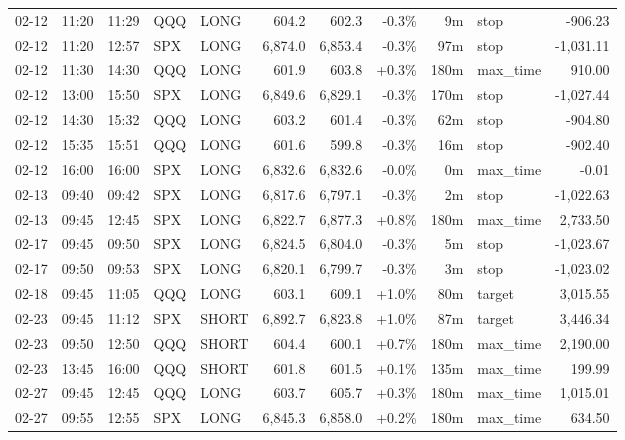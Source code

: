 \documentclass[11pt,a4paper,twoside]{article}
\begin{document}
\begin{center}
\begin{longtable}{>{\color{txtmain}}l l l l l r r r r >{\color{txtmain}}l r}
02-12 & 11:20 & 11:29 & QQQ & LONG & 604.2 & 602.3 & \textcolor{lossred}{-0.3\%} & 9m & stop & \textcolor{lossred}{-906.23} \\
02-12 & 11:20 & 12:57 & SPX & LONG & 6,874.0 & 6,853.4 & \textcolor{lossred}{-0.3\%} & 97m & stop & \textcolor{lossred}{-1,031.11} \\
02-12 & 11:30 & 14:30 & QQQ & LONG & 601.9 & 603.8 & \textcolor{wingreen}{+0.3\%} & 180m & max\_time & \textcolor{wingreen}{910.00} \\
02-12 & 13:00 & 15:50 & SPX & LONG & 6,849.6 & 6,829.1 & \textcolor{lossred}{-0.3\%} & 170m & stop & \textcolor{lossred}{-1,027.44} \\
02-12 & 14:30 & 15:32 & QQQ & LONG & 603.2 & 601.4 & \textcolor{lossred}{-0.3\%} & 62m & stop & \textcolor{lossred}{-904.80} \\
02-12 & 15:35 & 15:51 & QQQ & LONG & 601.6 & 599.8 & \textcolor{lossred}{-0.3\%} & 16m & stop & \textcolor{lossred}{-902.40} \\
02-12 & 16:00 & 16:00 & SPX & LONG & 6,832.6 & 6,832.6 & \textcolor{lossred}{-0.0\%} & 0m & max\_time & \textcolor{lossred}{-0.01} \\
02-13 & 09:40 & 09:42 & SPX & LONG & 6,817.6 & 6,797.1 & \textcolor{lossred}{-0.3\%} & 2m & stop & \textcolor{lossred}{-1,022.63} \\
02-13 & 09:45 & 12:45 & SPX & LONG & 6,822.7 & 6,877.3 & \textcolor{wingreen}{+0.8\%} & 180m & max\_time & \textcolor{wingreen}{2,733.50} \\
02-17 & 09:45 & 09:50 & SPX & LONG & 6,824.5 & 6,804.0 & \textcolor{lossred}{-0.3\%} & 5m & stop & \textcolor{lossred}{-1,023.67} \\
02-17 & 09:50 & 09:53 & SPX & LONG & 6,820.1 & 6,799.7 & \textcolor{lossred}{-0.3\%} & 3m & stop & \textcolor{lossred}{-1,023.02} \\
02-18 & 09:45 & 11:05 & QQQ & LONG & 603.1 & 609.1 & \textcolor{wingreen}{+1.0\%} & 80m & target & \textcolor{wingreen}{3,015.55} \\
02-23 & 09:45 & 11:12 & SPX & SHORT & 6,892.7 & 6,823.8 & \textcolor{wingreen}{+1.0\%} & 87m & target & \textcolor{wingreen}{3,446.34} \\
02-23 & 09:50 & 12:50 & QQQ & SHORT & 604.4 & 600.1 & \textcolor{wingreen}{+0.7\%} & 180m & max\_time & \textcolor{wingreen}{2,190.00} \\
02-23 & 13:45 & 16:00 & QQQ & SHORT & 601.8 & 601.5 & \textcolor{wingreen}{+0.1\%} & 135m & max\_time & \textcolor{wingreen}{199.99} \\
02-27 & 09:45 & 12:45 & QQQ & LONG & 603.7 & 605.7 & \textcolor{wingreen}{+0.3\%} & 180m & max\_time & \textcolor{wingreen}{1,015.01} \\
02-27 & 09:55 & 12:55 & SPX & LONG & 6,845.3 & 6,858.0 & \textcolor{wingreen}{+0.2\%} & 180m & max\_time & \textcolor{wingreen}{634.50} \\
\end{longtable}
\end{center}
\clearpage
\end{document}
